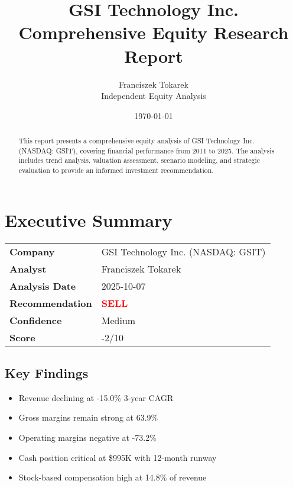 \documentclass[11pt,a4paper]{article}
\title{\Huge\bfseries GSI Technology Inc. \\ \Large Comprehensive Equity Research Report}
\author{\Large Franciszek Tokarek \\ \normalsize Independent Equity Analysis}
\date{\today}
\begin{document}
\maketitle
\thispagestyle{empty}

\begin{abstract}
This report presents a comprehensive equity analysis of GSI Technology Inc. (NASDAQ: GSIT), 
covering financial performance from 2011 to 2025. The analysis includes trend analysis, 
valuation assessment, scenario modeling, and strategic evaluation to provide an informed 
investment recommendation.
\end{abstract}

\newpage

\tableofcontents

\newpage

\section{Executive Summary}

\vspace{0.5cm}

\begin{center}
\begin{tabular}{ll}
\toprule
\textbf{Company} & GSI Technology Inc. (NASDAQ: GSIT) \\
\textbf{Analyst} & Franciszek Tokarek \\
\textbf{Analysis Date} & 2025-10-07 \\
\textbf{Recommendation} & \textcolor{red}{\textbf{SELL}} \\
\textbf{Confidence} & Medium \\
\textbf{Score} & -2/10 \\
\bottomrule
\end{tabular}
\end{center}

\vspace{0.5cm}

\subsection{Key Findings}

\begin{itemize}
\itemsep0.3em
\item Revenue declining at -15.0\% 3-year CAGR
\item Gross margins remain strong at 63.9\%
\item Operating margins negative at -73.2\%
\item Cash position critical at \$995K with 12-month runway
\item Stock-based compensation high at 14.8\% of revenue
\end{itemize}
\end{document}
